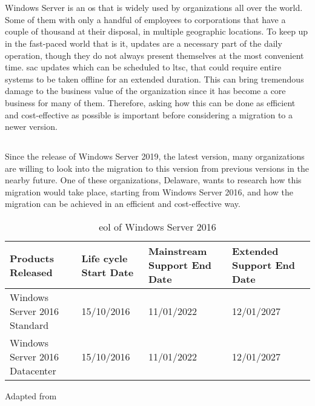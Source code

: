 \chapter{}
\label{ch:inleiding}
Windows Server is an \acrfull{os} that is widely used by organizations all over the world. Some of them with only a handful of employees to corporations that have a couple of thousand at their disposal, in multiple geographic locations. To keep up in the fast-paced world that is \acrfull{it}, updates are a necessary part of the daily operation, though they do not always present themselves at the most convenient time. 
\acrfull{sac} updates which can be scheduled to \acrfull{ltsc}, that could require entire systems to be taken offline for an extended duration. This can bring tremendous damage to the business value of the organization since \acrshort{it} has become a core business for many of them. Therefore, asking how this can be done as efficient and cost-effective as possible is important before considering a migration to a newer version. 

\section{}
\label{sec:probleemstelling}
Since the release of Windows Server 2019, the latest version, many organizations are willing to look into the migration to this version from previous versions in the nearby future. One of these organizations, Delaware, wants to research how this migration would take place, starting from Windows Server 2016, and how the migration can be achieved in an efficient and cost-effective way. 

\begin{table}[ht]
	\centering
	\begin{adjustbox}{width=1\textwidth}
		\begin{tabular}{l|l|l|ll}
			Products Released & Life cycle Start Date & Mainstream Support End Date & Extended Support End Date &\\
			\hline
			Windows Server 2016 Standard & 15/10/2016 & 11/01/2022 & 12/01/2027 &\\
			Windows Server 2016 Datacenter & 15/10/2016 & 11/01/2022 & 12/01/2027 &\\
		\end{tabular}
	\end{adjustbox}
	\caption[\acrshort{eol} \acrshort{ws}2016]{\acrshort{eol} of Windows Server 2016}
	\scriptsize	
	Adapted from \cite{MicrosoftEOL2019}
	\label{tab:EOL2016}
\end{table}

